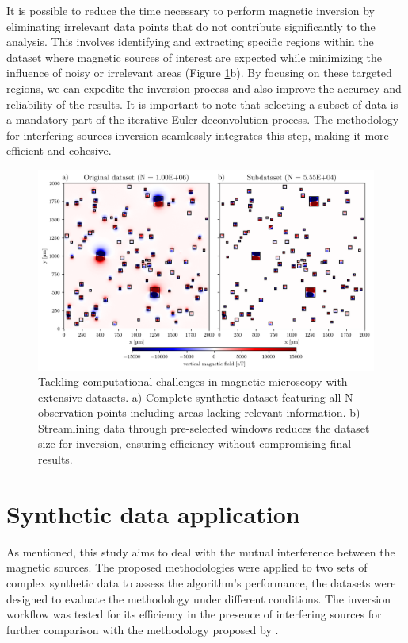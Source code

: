 It is possible to reduce the time necessary to perform magnetic inversion by eliminating irrelevant data points that do not contribute significantly to the analysis. This involves identifying and extracting specific regions within the dataset where magnetic sources of interest are expected while minimizing the influence of noisy or irrelevant areas (Figure \ref{methodology}b). By focusing on these targeted regions, we can expedite the inversion process and also improve the accuracy and reliability of the results. It is important to note that selecting a subset of data is a mandatory part of the iterative Euler deconvolution process. The methodology for interfering sources inversion seamlessly integrates this step, making it more efficient and cohesive.


\begin{figure}[tb!]
  \centering
  \includegraphics[width=1\linewidth]{figures/methodology.png}
  \caption{
    Tackling computational challenges in magnetic microscopy with extensive datasets.
    a) Complete synthetic dataset featuring all N observation points including areas lacking relevant information.
    b) Streamlining data through pre-selected windows reduces the dataset size for inversion, ensuring efficiency without compromising final results.
      }
  \label{methodology}
\end{figure}




\section{Synthetic data application}

As mentioned, this study aims to deal with the mutual interference between the magnetic sources. The proposed methodologies were applied to two sets of complex synthetic data to assess the algorithm's performance, the datasets were designed to evaluate the methodology under different conditions. The inversion workflow was tested for its efficiency in the presence of interfering sources for further comparison with the methodology proposed by  \citet{Souza-Junior2023b}.

